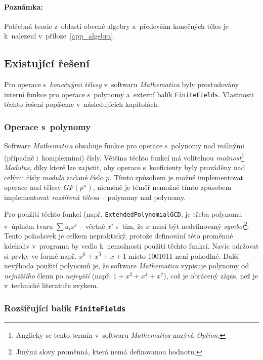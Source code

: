 \documentclass[thesis=M,czech,hidelinks]{FITthesis}[2012/06/26]
\newcommand{\0}{{\textcolor[gray]{0.75}{0}}}
\begin{document}
\paragraph{Poznámka:} Potřebná teorie z~oblasti obecné algebry a~především
konečných těles je k~nalezení v~příloze~\ref{app_algebra}.

\subsection{Existující řešení}\label{kap_existujici_reseni}

Pro operace s~\emph{konečnými tělesy} v~softwaru \emph{Mathematica} byly
prostudovány interní funkce pro operace s~polynomy a~externí balík
\texttt{FiniteFields}. Vlastnosti těchto řešení popíšeme v~následujících
kapitolách.


\subsubsection{Operace s~polynomy}

Software \emph{Mathematica} obsahuje funkce pro operace s~polynomy nad reálnými
(případně i~komplexními) čísly. Většina těchto funkcí má volitelnou
\emph{možnost}\footnote{
    Anglicky se tento termín v~softwaru \emph{Mathematica} nazývá \emph{Option}.
} \emph{Modulus}, díky které lze zajistit, aby operace s~koeficienty byly
prováděny nad celými čísly \emph{modulo} zadané číslo $p$. Tímto způsobem je
možné implementovat operace nad tělesy $GF(p^n)$, nicméně je téměř nemožné tímto
způsobem implementovat \emph{rozšířená tělesa} -- polynomy nad polynomy.

Pro použití těchto funkcí (např. \texttt{ExtendedPolynomialGCD}, je třeba
polynomu v~úplném tvaru $\sum a_i x^i$ -- včetně $x^i$ s~tím, že $x$ musí být
nedefinovaný \emph{symbol}\footnote{
    Jinými slovy proměnná, která nemá definovanou hodnotu.
}. Tento požadavek je celkem nepraktický, protože definování této proměnné
kdekoliv v~programu by vedlo k~nemožnosti použití těchto funkcí. Navíc udržovat
si prvky ve formě např. $x^6 + x^3 + x + 1$ místo $1001011$ není pohodlné.
Další nevýhoda použití polynomů je, že software \emph{Mathematica} vypisuje
polynomy od \emph{nejnižšího} členu po \emph{nejvyšší} (např. $1+x^2+x^4+x^7$),
což je obrácený zápis, než je v~technické literatuře zvykem.


\subsubsection{Rozšiřující balík \texttt{FiniteFields}}
\end{document}
